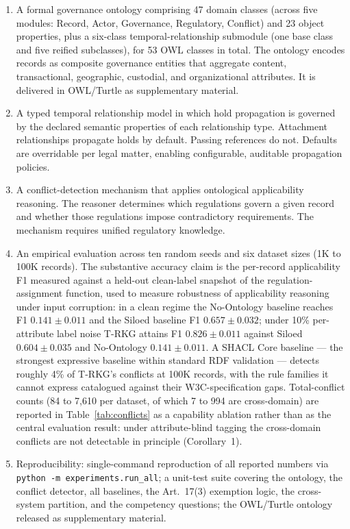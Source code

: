 \documentclass{ieeeaccess}
\begin{document}
\begin{enumerate}
    \item A formal governance ontology comprising 47 domain classes (across five modules: Record, Actor, Governance, Regulatory, Conflict) and 23 object properties, plus a six-class temporal-relationship submodule (one base class and five reified subclasses), for 53 OWL classes in total. The ontology encodes records as composite governance entities that aggregate content, transactional, geographic, custodial, and organizational attributes. It is delivered in OWL/Turtle as supplementary material.
    \item A typed temporal relationship model in which hold propagation is governed by the declared semantic properties of each relationship type. Attachment relationships propagate holds by default. Passing references do not. Defaults are overridable per legal matter, enabling configurable, auditable propagation policies.
    \item A conflict-detection mechanism that applies ontological applicability reasoning. The reasoner determines which regulations govern a given record and whether those regulations impose contradictory requirements. The mechanism requires unified regulatory knowledge.
    \item An empirical evaluation across ten random seeds and six dataset sizes (1K to 100K records). The substantive accuracy claim is the per-record applicability F1 measured against a held-out clean-label snapshot of the regulation-assignment function, used to measure robustness of applicability reasoning under input corruption: in a clean regime the No-Ontology baseline reaches F1 $0.141 \pm 0.011$ and the Siloed baseline F1 $0.657 \pm 0.032$; under 10\% per-attribute label noise T-RKG attains F1 $0.826 \pm 0.011$ against Siloed $0.604 \pm 0.035$ and No-Ontology $0.141 \pm 0.011$. A SHACL Core baseline --- the strongest expressive baseline within standard RDF validation --- detects roughly 4\% of T-RKG's conflicts at 100K records, with the rule families it cannot express catalogued against their W3C-specification gaps. Total-conflict counts (84 to 7{,}610 per dataset, of which 7 to 994 are cross-domain) are reported in Table~\ref{tab:conflicts} as a capability ablation rather than as the central evaluation result: under attribute-blind tagging the cross-domain conflicts are not detectable in principle (Corollary~1).
    \item Reproducibility: single-command reproduction of all reported numbers via \texttt{python -m experiments.run\_all}; a unit-test suite covering the ontology, the conflict detector, all baselines, the Art.~17(3) exemption logic, the cross-system partition, and the competency questions; the OWL/Turtle ontology released as supplementary material.
\end{enumerate}
\end{document}
